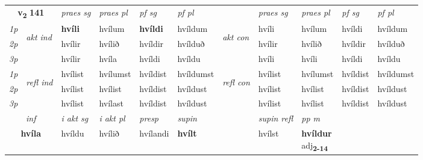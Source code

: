 \noindent
\begin{tabular}{lllllllllll} \toprule
\multicolumn{2}{c}{\textbf{v{\textsubscript{2}}} \Large{\textbf{141}}}  &  \textit{praes sg}  & \textit{praes pl}  &\textit{ pf sg} & \textit{pf pl} &  &  \textit{praes sg}  & \textit{praes pl}  & \textit{pf sg} & \textit{pf pl } \\*
	\cmidrule{3-6} \cmidrule{8-11}
 {\textit{1p}} & \multirow{3}{*}{\begin{turn}{90}\textit{akt ind}\end{turn}} & \textbf{hvíli} & hvílum & \textbf{hvíldi} & hvíldum & \multirow{3}{*}{\begin{turn}{90}\textit{akt con}\end{turn}} &hvíli & hvílum & hvíldi & hvíldum\\*
 {\textit{2p}} &  &  hvílir  & hvílið & hvíldir & hvílduð & & hvílir & hvílið & hvíldir & hvílduð \\*
{\textit{3p}} &  & hvílir & hvíla & hvíldi & hvíldu & & hvíli & hvíli& hvíldi & hvíldu \\*
\cmidrule{3-6} \cmidrule{8-11}
 {\textit{1p}} & \multirow{3}{*}{\begin{turn}{90}\textit{refl ind}\end{turn}}  & hvílist & hvílumst & hvíldist & hvíldumst & \multirow{3}{*}{\begin{turn}{90}\textit{refl con}\end{turn}}  &hvílist & hvílumst & hvíldist & hvíldumst \\*
 {\textit{2p}} &  & hvílist & hvílist & hvíldist & hvíldust & &hvílist & hvílist & hvíldist & hvíldust \\*
 {\textit{3p}}  & & hvílist & hvílast & hvíldist & hvíldust & & hvílist & hvílist& hvíldist & hvíldust \\*
\cmidrule{3-6} \cmidrule{8-11}

   \multicolumn{2}{c}{\textit{inf}}  & \textit{i akt sg} & \textit{i akt pl}   & \textit{presp} & \textit{supin} && \textit{supin refl} & \textit{pp m} \\*
  \multicolumn{2}{c}{\textbf{hvíla}} & hvíldu  & hvílið   & hvílandi &  \textbf{hvílt} && hvílst & \specialcell{\textbf{hvíldur} \\ adj\textbf{\textsubscript{2-14}}} \\*
\end{tabular}

